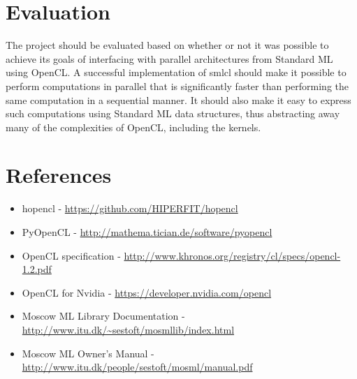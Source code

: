 \documentclass[a4paper, 10pt]{article}
\begin{document}
\section{Evaluation}

The project should be evaluated based on whether or not it was
possible to achieve its goals of interfacing with parallel
architectures from Standard ML using OpenCL. A successful
implementation of smlcl should make it possible to perform
computations in parallel that is significantly faster than performing
the same computation in a sequential manner. It should also make it
easy to express such computations using Standard ML data structures,
thus abstracting away many of the complexities of OpenCL, including
the kernels.

\section{References}

\begin{itemize}
  \item hopencl - \url{https://github.com/HIPERFIT/hopencl} \\
  \item PyOpenCL - \url{http://mathema.tician.de/software/pyopencl} \\
  \item OpenCL specification -
    \url{http://www.khronos.org/registry/cl/specs/opencl-1.2.pdf} \\
  \item OpenCL for Nvidia - \url{https://developer.nvidia.com/opencl}
    \\
  \item Moscow ML Library Documentation - \url{http://www.itu.dk/~sestoft/mosmllib/index.html} \\
  \item Moscow ML Owner's Manual - \url{http://www.itu.dk/people/sestoft/mosml/manual.pdf} \\
\end{itemize}
\end{document}
